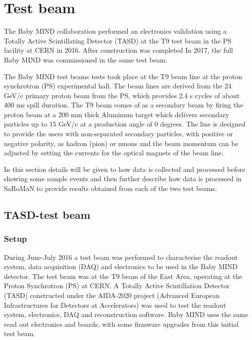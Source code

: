 \chapter{Test beam}
\label{c:Testbeam}

The Baby MIND collaboration performed an electronics validation using a Totally Active Scintillating Detector (TASD) at the T9 test beam in the PS facility at CERN in 2016. After construction was completed In 2017, the full Baby MIND was commissioned in the same test beam.

The Baby MIND test beams tests took place at the T9 beam line at the proton synchrotron (PS) experimental hall. The beam lines are derived from the 24 GeV/c primary proton beam from the PS, which provides 2.4 s cycles of about 400 ms spill duration. The T9 beam comes of as a secondary beam by firing the proton beam at a 200 mm thick Aluminum target which delivers secondary particles up to 15 GeV/c at a production angle of 0 degrees. The line is designed to provide the users with non-separated secondary particles, with positive or negative polarity, as hadron (pion) or muons and the beam momentum can be adjusted by setting the currents for the optical magnets of the beam line.

In this section details will be given to how data is collected and processed before showing some sample events and then further describe how data is processed in SaRoMaN to provide results obtained from each of the two test beams.


\section{TASD-test beam}

\subsection{Setup}
During June-July 2016 a test beam was performed to characterise the readout system, data acquisition (DAQ) and electronics to be used in the Baby MIND detector. The test beam was at the T9 beam of the East Area, operating at the Proton Synchrotron (PS) at CERN. A Totally Active Scintillation Detector (TASD) constructed under the AIDA-2020 project (Advanced European Infrastructures for Detectors at Accelerators) was used to test the readout system, electronics, DAQ and reconstruction software. Baby MIND uses the same read out electronics and boards, with some firmware upgrades from this initial test beam.

